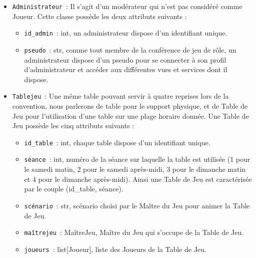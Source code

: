 \documentclass[11pt]{article}
\begin{document}
\begin{itemize}
    \item \texttt{Administrateur}~: Il s’agit d’un modérateur qui n’est pas considéré comme Joueur. Cette classe possède les deux attributs suivants :
    \begin{itemize}[label=, font=\small]
        \item \texttt{id\_admin}~: int, un administrateur dispose d'un identifiant unique.
        \item \texttt{pseudo}~: str, comme tout membre de la conférence de jeu de rôle, un administrateur dispose d'un pseudo pour se connecter à son profil d'administrateur et accéder aux différentes vues et services dont il dispose.
    \end{itemize}

    \item \texttt{Tablejeu}~: Une même table pouvant servir à quatre reprises lors de la convention, nous parlerons de table pour le support physique, et de Table de Jeu pour l'utilisation d'une table sur une plage horaire donnée. Une Table de Jeu possède les cinq attributs suivants :
    \begin{itemize}[label=, font=\small]
        \item \texttt{id\_table}~: int, chaque table dispose d'un  identifiant unique.
        \item \texttt{séance}~: int, numéro de la séance sur laquelle la table est utilisée (1 pour le samedi matin, 2 pour le samedi après-midi, 3 pour le dimanche matin et 4 pour le dimanche après-midi). Ainsi une Table de Jeu est caractérisée par le couple (id\_table, séance).
        \item \texttt{scénario}~: str, scénario choisi par le Maître du Jeu pour animer la Table de Jeu.
        \item \texttt{maîtrejeu}~: MaîtreJeu, Maître du Jeu qui s'occupe de la Table de Jeu.
        \item \texttt{joueurs}~: list[Joueur], liste des Joueurs de la Table de Jeu. 
    \end{itemize}
    

\end{itemize}
\end{document}
